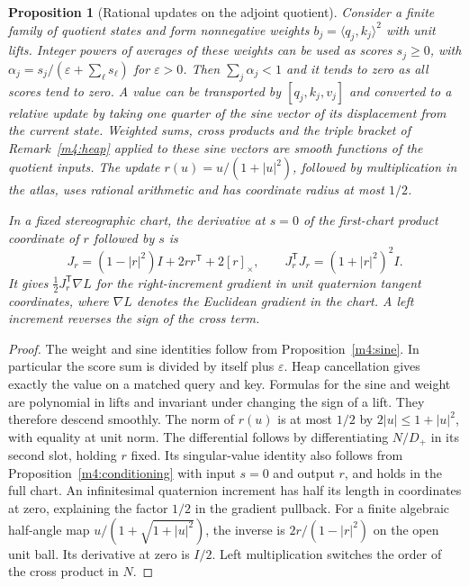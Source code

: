 \documentclass[11pt,reqno]{amsart}
\newtheorem{proposition}[theorem]{Proposition}
\theoremstyle{definition}
\theoremstyle{remark}
\numberwithin{equation}{section}
\newcommand{\ip}[2]{\langle #1,#2\rangle}
\newcommand{\hp}[3]{[#1,#2,#3]}
\begin{document}
\begin{proposition}[Rational updates on the adjoint quotient]\label{m4:updates}
Consider a finite family of quotient states and form nonnegative weights $b_j=\ip{q_j}{k_j}^2$ with unit lifts. Integer powers of averages of these weights can be used as scores $s_j\ge0$, with $\alpha_j=s_j/(\varepsilon+\sum_\ell s_\ell)$ for $\varepsilon>0$. Then $\sum_j\alpha_j<1$ and it tends to zero as all scores tend to zero. A value can be transported by $\hp{q_j}{k_j}{v_j}$ and converted to a relative update by taking one quarter of the sine vector of its displacement from the current state. Weighted sums, cross products and the triple bracket of Remark~\ref{m4:heap} applied to these sine vectors are smooth functions of the quotient inputs. The update $r(u)=u/(1+|u|^2)$, followed by multiplication in the atlas, uses rational arithmetic and has coordinate radius at most $1/2$.

In a fixed stereographic chart, the derivative at $s=0$ of the first-chart product coordinate of $r$ followed by $s$ is
\[
 J_r=(1-|r|^2)I+2rr^{\mathsf T}+2[r]_\times,\qquad
 J_r^{\mathsf T}J_r=(1+|r|^2)^2 I.
\]
It gives $\tfrac12 J_r^{\mathsf T}\nabla L$ for the right-increment gradient in unit quaternion tangent coordinates, where $\nabla L$ denotes the Euclidean gradient in the chart. A left increment reverses the sign of the cross term.
\end{proposition}
\begin{proof}
The weight and sine identities follow from Proposition~\ref{m4:sine}. In particular the score sum is divided by itself plus $\varepsilon$. Heap cancellation gives exactly the value on a matched query and key. Formulas for the sine and weight are polynomial in lifts and invariant under changing the sign of a lift. They therefore descend smoothly. The norm of $r(u)$ is at most $1/2$ by $2|u|\le1+|u|^2$, with equality at unit norm. The differential follows by differentiating $N/D_+$ in its second slot, holding $r$ fixed. Its singular-value identity also follows from Proposition~\ref{m4:conditioning} with input $s=0$ and output $r$, and holds in the full chart. An infinitesimal quaternion increment has half its length in coordinates at zero, explaining the factor $1/2$ in the gradient pullback. For a finite algebraic half-angle map $u/(1+\sqrt{1+|u|^2})$, the inverse is $2r/(1-|r|^2)$ on the open unit ball. Its derivative at zero is $I/2$. Left multiplication switches the order of the cross product in $N$.
\end{proof}
\end{document}
